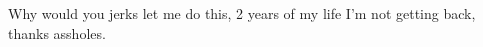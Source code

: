 {}

Why would you jerks let me do this, 2 years of my life I'm not getting back, thanks assholes.

\clearpage %